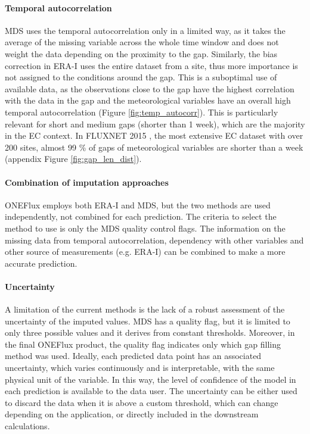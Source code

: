 \documentclass{article}
\begin{document}
\paragraph{Temporal autocorrelation} MDS uses the temporal autocorrelation only in a limited way, as it takes the average of the missing variable across the whole time window and does not weight the data depending on the proximity to the gap.  Similarly, the bias correction in ERA-I uses the entire dataset from a site, thus more importance is not assigned to the conditions around the gap.  This is a suboptimal use of available data, as the observations close to the gap have the highest correlation with the data in the gap and the meteorological variables have an overall high temporal autocorrelation (Figure \ref{fig:temp_autocorr}). This is particularly relevant for short and medium gaps (shorter than 1 week), which are the majority in the EC context.
In FLUXNET 2015 \cite{pastorello_fluxnet2015_2020}, the most extensive EC dataset with over 200 sites, almost 99 \% of gaps of meteorological variables are shorter than a week (appendix Figure \ref{fig:gap_len_dist}).

\paragraph{Combination of imputation approaches} \textsf{ONEFlux} employs both ERA-I and MDS, but the two methods are used independently, not combined for each prediction. The criteria to select the method to use is only the MDS quality control flags. The information on the missing data from temporal autocorrelation, dependency with other variables and other source of measurements (e.g. ERA-I) can be combined to make a more accurate prediction.

\paragraph{Uncertainty} A limitation of the current methods is the lack of a robust assessment of the uncertainty of the imputed values. MDS has a quality flag, but it is limited to only three possible values and it derives from constant thresholds. Moreover, in the final \textsf{ONEFlux} product, the quality flag indicates only which gap filling method was used. Ideally, each predicted data point has an associated uncertainty, which varies continuously and is interpretable, with the same physical unit of the variable.  In this way, the level of confidence of the model in each prediction is available to the data user. The uncertainty can be either used to discard the data when it is above a custom threshold, which can change depending on the application, or directly included in the downstream calculations.
\end{document}
